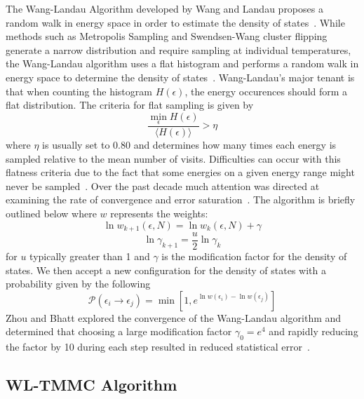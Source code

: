 \documentclass[letterpaper,twocolumn,amsmath,amssymb,pre,aps,10pt]{revtex4-1}
\begin{document}
The Wang-Landau Algorithm developed by Wang and Landau proposes a
random walk in energy space in order to estimate the density of
states~\cite{wang2001efficient}. While methods such as Metropolis
Sampling and Swendsen-Wang cluster
flipping~\cite{swendsen1987nonuniversal} generate a narrow distribution
and require sampling at individual temperatures, the Wang-Landau
algorithm uses a flat histogram and performs a random walk in energy
space to determine the density of states~\cite{wang2001determining,
landau2014guide}. Wang-Landau's major tenant is that when counting the
histogram $H(\epsilon)$, the energy occurences should form a flat
distribution.  The criteria for flat sampling is given by
\begin{equation}
	\frac{\min_{\epsilon} H(\epsilon)}
	{\big\langle H(\epsilon)\big\rangle }
	> \eta
\end{equation} where $\eta$ is usually set to $0.80$ and determines how
many times each energy is sampled relative to the mean number of
visits.  Difficulties can occur with this flatness criteria due to the
fact that some energies on a given energy range might never be
sampled~\cite{haber2014transition}.  Over the past decade much
attention was directed at examining the rate of convergence and error
saturation~\cite{lee2006convergence, belardinelli2007wang}.  The
algorithm is briefly outlined below where $w$ represents the weights:
\begin{equation}
	\ln{w_{k+1}(\epsilon,N)}=\ln{w_{k}(\epsilon,N)}
	+\gamma
\end{equation}
\begin{equation}
	\ln{\gamma_{k+1}}=\frac{u}{2}\ln{\gamma_{k}}
\end{equation}
for $u$ typically greater than 1 and $\gamma$ is the modification factor for
the density of states.  We then accept a new configuration for the density of
states with a probability given by the following
\begin{equation}
	\mathcal{P}(\epsilon_i \rightarrow \epsilon_j)
	= \min[1,e^{\ln{w(\epsilon_i)}-\ln{w(\epsilon_j)}}]
\end{equation}
Zhou and Bhatt explored the convergence of the Wang-Landau algorithm and
determined that choosing a large modification factor $\gamma_0 = e^{4}$ and
rapidly reducing the factor by 10 during each step resulted in reduced statistical
error~\cite{zhou2005understanding}.


\subsection{WL-TMMC Algorithm}
\end{document}
